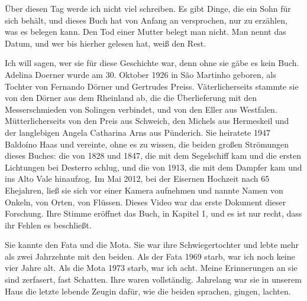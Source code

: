 \documentclass[
  ngerman,
  11pt,
  openany]{book}
\begin{document}
Über diesen Tag werde ich nicht viel schreiben. Es gibt Dinge, die ein
Sohn für sich behält, und dieses Buch hat von Anfang an versprochen, nur
zu erzählen, was es belegen kann. Den Tod einer Mutter belegt man nicht.
Man nennt das Datum, und wer bis hierher gelesen hat, weiß den Rest.

Ich will sagen, wer sie für diese Geschichte war, denn ohne sie gäbe es
kein Buch. Adelina Doerner wurde am 30. Oktober 1926 in São Martinho
geboren, als Tochter von Fernando Dörner und Gertrudes Preiss.
Väterlicherseits stammte sie von den Dörner aus dem Rheinland ab, die
die Überlieferung mit den Messerschmieden von Solingen verbindet, und
von den Eller aus Westfalen. Mütterlicherseits von den Preis aus
Schweich, den Michels aus Hermeskeil und der langlebigen Angela
Catharina Arns aus Pünderich. Sie heiratete 1947 Baldoíno Haas und
vereinte, ohne es zu wissen, die beiden großen Strömungen dieses Buches:
die von 1828 und 1847, die mit dem Segelschiff kam und die ersten
Lichtungen bei Desterro schlug, und die von 1913, die mit dem Dampfer
kam und ins Alto Vale hinaufzog. Im Mai 2012, bei der Eisernen Hochzeit
nach 65 Ehejahren, ließ sie sich vor einer Kamera aufnehmen und nannte
Namen von Onkeln, von Orten, von Flüssen. Dieses Video war das erste
Dokument dieser Forschung. Ihre Stimme eröffnet das Buch, in Kapitel 1,
und es ist nur recht, dass ihr Fehlen es beschließt.

Sie kannte den Fata und die Mota. Sie war ihre Schwiegertochter und
lebte mehr als zwei Jahrzehnte mit den beiden. Als der Fata 1969 starb,
war ich noch keine vier Jahre alt. Als die Mota 1973 starb, war ich
acht. Meine Erinnerungen an sie sind zerfasert, fast Schatten. Ihre
waren vollständig. Jahrelang war sie in unserem Haus die letzte lebende
Zeugin dafür, wie die beiden sprachen, gingen, lachten.
\end{document}
